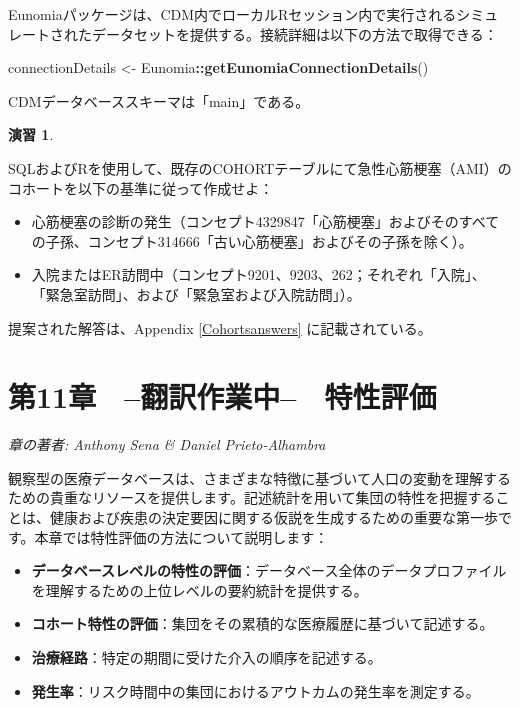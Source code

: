 \documentclass[
  11pt]{book}
\newenvironment{Shaded}{\begin{snugshade}}{\end{snugshade}}
\newcommand{\FunctionTok}[1]{\textcolor[rgb]{0.13,0.29,0.53}{\textbf{#1}}}
\newcommand{\NormalTok}[1]{#1}
\newcommand{\OtherTok}[1]{\textcolor[rgb]{0.56,0.35,0.01}{#1}}
\newcommand{\SpecialCharTok}[1]{\textcolor[rgb]{0.81,0.36,0.00}{\textbf{#1}}}
\providecommand{\tightlist}{%
  \setlength{\itemsep}{0pt}\setlength{\parskip}{0pt}}
\theoremstyle{definition}
\theoremstyle{definition}
\theoremstyle{definition}
\newtheorem{exercise}{演習}[chapter]
\theoremstyle{definition}
\theoremstyle{remark}
\begin{document}
Eunomiaパッケージは、CDM内でローカルRセッション内で実行されるシミュレートされたデータセットを提供する。接続詳細は以下の方法で取得できる：

\begin{Shaded}
\begin{Highlighting}[]
\NormalTok{connectionDetails }\OtherTok{\textless{}{-}}\NormalTok{ Eunomia}\SpecialCharTok{::}\FunctionTok{getEunomiaConnectionDetails}\NormalTok{()}
\end{Highlighting}
\end{Shaded}

CDMデータベーススキーマは「main」である。

\begin{exercise}
\protect\hypertarget{exr:exerciseCohortsSql}{}\label{exr:exerciseCohortsSql}

SQLおよびRを使用して、既存のCOHORTテーブルにて急性心筋梗塞（AMI）のコホートを以下の基準に従って作成せよ：

\begin{itemize}
\tightlist
\item
  心筋梗塞の診断の発生（コンセプト4329847「心筋梗塞」およびそのすべての子孫、コンセプト314666「古い心筋梗塞」およびその子孫を除く）。
\item
  入院またはER訪問中（コンセプト9201、9203、262；それぞれ「入院」、 「緊急室訪問」、および「緊急室および入院訪問」）。
\end{itemize}

\end{exercise}

提案された解答は、Appendix \ref{Cohortsanswers} に記載されている。

\chapter{第11章　--翻訳作業中--　特性評価}\label{Characterization}

\emph{章の著者: Anthony Sena \& Daniel Prieto-Alhambra}

観察型の医療データベースは、さまざまな特徴に基づいて人口の変動を理解するための貴重なリソースを提供します。記述統計を用いて集団の特性を把握することは、健康および疾患の決定要因に関する仮説を生成するための重要な第一歩です。本章では特性評価の方法について説明します：

\begin{itemize}
\tightlist
\item
  \textbf{データベースレベルの特性の評価}：データベース全体のデータプロファイルを理解するための上位レベルの要約統計を提供する。
\item
  \textbf{コホート特性の評価}：集団をその累積的な医療履歴に基づいて記述する。
\item
  \textbf{治療経路}：特定の期間に受けた介入の順序を記述する。
\item
  \textbf{発生率}：リスク時間中の集団におけるアウトカムの発生率を測定する。
\end{itemize}
\end{document}
